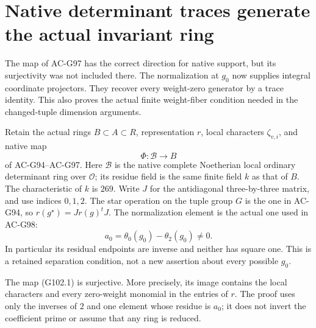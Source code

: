 \section{Native determinant traces generate the actual invariant ring}
\label{sec:cubic-native-invariant-surjectivity}

The map of AC-G97 has the correct direction for native support, but
its surjectivity was not included there.  The normalization at $g_0$
now supplies integral coordinate projectors.  They recover every
weight-zero generator by a trace identity.  This also proves the
actual finite weight-fiber condition needed in the changed-tuple
dimension arguments.

Retain the actual rings $B\subset A\subset R$, representation $r$,
local characters $\zeta_{v,i}$, and native map
\[
             \Phi:\mathscr B\longrightarrow B
\tag{G102.1}
\]
of AC-G94--AC-G97.  Here $\mathscr B$ is the native complete
Noetherian local ordinary determinant ring over $\mathcal O$;
its residue field is the same finite field $k$ as that of $B$.
The characteristic of $k$ is $269$.  Write $J$ for the
antidiagonal three-by-three matrix, and use indices $0,1,2$.
The star operation on the tuple group $G$ is the one in AC-G94,
so $r(g^\star)=Jr(g)^tJ$.
The normalization element is the actual one used in AC-G98:
\[
 a_0=\theta_0(g_0)-\theta_2(g_0)\ne0.
\tag{G102.2}
\]
In particular its residual endpoints are inverse and neither
has square one.  This is a retained separation
condition, not a new assertion about every possible $g_0$.

\begin{theorem}
\label{thm:ACG102surj}
The map (G102.1) is surjective.  More precisely, its image
contains the local characters and every zero-weight monomial
in the entries of $r$.  The proof uses only the inverses of
$2$ and one element whose residue is $a_0$; it does not invert
the coefficient prime or assume that any ring is reduced.
\end{theorem}


